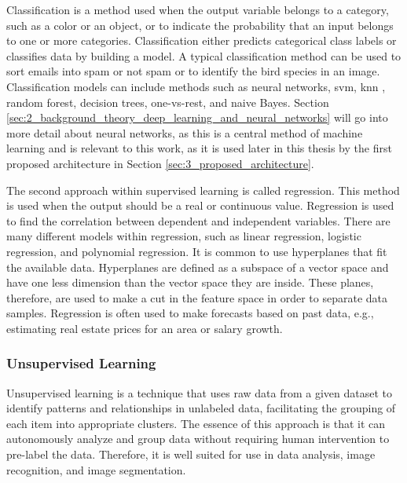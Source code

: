         Classification is a method used when the output variable belongs to a category, such as a color or an object, or to indicate the probability that an input belongs to one or more categories. Classification either predicts categorical class labels or classifies data by building a model. A typical classification method can be used to sort emails into spam or not spam or to identify the bird species in an image. Classification models can include methods such as neural networks, \gls{svm}, \gls{knn} \cite{fixDiscriminatoryAnalysisNonparametric1989, coverNearestNeighborPattern1967}, random forest, decision trees, one-vs-rest, and naive Bayes. Section \ref{sec:2_background_theory_deep_learning_and_neural_networks} will go into more detail about neural networks, as this is a central method of machine learning and is relevant to this work, as it is used later in this thesis by the first proposed architecture in Section \ref{sec:3_proposed_architecture}.
        
        The second approach within supervised learning is called regression. This method is used when the output should be a real or continuous value. Regression is used to find the correlation between dependent and independent variables. There are many different models within regression, such as linear regression, logistic regression, and polynomial regression. It is common to use hyperplanes that fit the available data. Hyperplanes are defined as a subspace of a vector space and have one less dimension than the vector space they are inside. These planes, therefore, are used to make a cut in the feature space in order to separate data samples.
        Regression is often used to make forecasts based on past data, e.g., estimating real estate prices for an area or salary growth.


        \subsubsection{Unsupervised Learning}

        Unsupervised learning is a technique that uses raw data from a given dataset to identify patterns and relationships in unlabeled data, facilitating the grouping of each item into appropriate clusters. The essence of this approach is that it can autonomously analyze and group data without requiring human intervention to pre-label the data. Therefore, it is well suited for use in data analysis, image recognition, and image segmentation.

        
        
